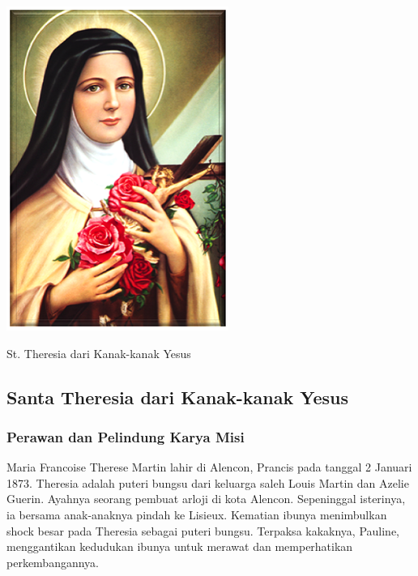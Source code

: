 \documentclass[12pt]{scrartcl}
\author{Yohanes Suyanto}
\begin{document}
\sloppy
\thispagestyle{empty}
\begin{center}
\includegraphics[scale=2.5]{st-theresia-kanak2.png}

St. Theresia dari Kanak-kanak Yesus
\end{center}

\newpage
\scriptsize
\subsection*{Santa Theresia dari Kanak-kanak Yesus}
\subsubsection*{Perawan dan Pelindung Karya Misi}

Maria Francoise Therese Martin lahir di Alencon, Prancis pada tanggal 2 Januari 1873. Theresia adalah puteri bungsu dari keluarga saleh Louis Martin dan Azelie Guerin. Ayahnya seorang pembuat arloji di kota Alencon. Sepeninggal isterinya, ia bersama a\-nak-a\-nak\-nya pindah ke Lisieux. Kematian ibunya menimbulkan shock besar pada Theresia sebagai puteri bungsu. Terpaksa kakaknya, Pauline, menggantikan kedudukan ibunya untuk merawat dan memperhatikan perkembangannya.
\end{document}
